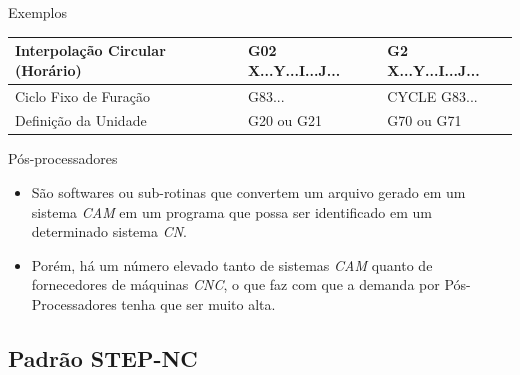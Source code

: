 \documentclass[aspectratio=169]{beamer}
\begin{document}
{\begin{frame}{Exemplos}
\begin{itemize}
{\begin{table}[H]
{\begin{tabular}{p{4.3cm}|p{2.6cm}|p{2.4cm}}
          \hline
          \footnotesize{Interpolação Circular (Horário)} & 
          \footnotesize{G02 X...Y...I...J...} & 
          \footnotesize{G2 X...Y...I...J...} \\
      
          \hline
          \footnotesize{Ciclo Fixo de Furação} & 
          \footnotesize{G83...} & 
          \footnotesize{CYCLE G83...} \\
      
          \hline
          \footnotesize{Definição da Unidade} & 
          \footnotesize{G20 ou G21 } & 
          \footnotesize{G70 ou G71} \\

          \hline

        \end{tabular}}
      \end{table}
    }    
  \end{itemize}
\end{frame}


\begin{frame}{Pós-processadores}

  \begin{itemize}

    \item {
      São softwares ou sub-rotinas 
      que convertem um arquivo gerado em um sistema \emph{CAM} 
      em um programa que possa ser identificado em um 
      determinado sistema \emph{CN}.
    }
    
    \item {
      Porém, há um número elevado tanto de sistemas
      \emph{CAM} quanto de fornecedores de máquinas \emph{CNC}, 
      o que faz com que a demanda por Pós-Processadores
      tenha que ser muito alta.
    }

  \end{itemize}   

\end{frame}


\subsection{Padrão STEP-NC}

}
\end{document}
